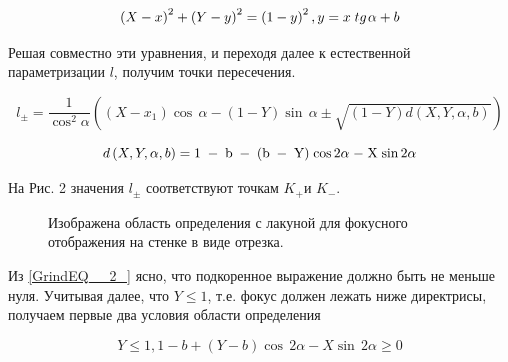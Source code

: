 \documentclass[a4paper]{article}
\begin{document}
\begin{equation} \label{GrindEQ__1_} \left(X-x\right)^{2} +\left(Y-y\right)^{2} =\left(1-y\right)^{2}  , y=x\; tg{\kern 1pt} \alpha +b \end{equation}

Решая совместно эти уравнения, и переходя далее к естественной параметризации $l$, получим точки пересечения.

\begin{equation} \label{GrindEQ__2_}  l_{\pm } =\frac{1}{\cos ^{2} \alpha } \left(\left(X-x_{1} \right)\cos \, \alpha -\left(1-Y\right)\sin \, \alpha \pm \sqrt{\left(1-Y\right)d\left(X,Y,\alpha ,b\right)} \right)\end{equation}

\[d\left(X,Y,\alpha ,b\right)={\rm 1\; -\; b\; -\; (b\; -\; Y)\; cos}\, {\rm 2}\alpha {\rm \; -\; X\; sin}\, {\rm 2}\alpha \]

На Рис. 2 значения $l_{\pm } $ соответствуют точкам $K_{+} $и $K_{-} $.


\begin{figure}[h]
\caption{Изображена область определения с лакуной для фокусного отображения на стенке в виде отрезка.}
\label{image5}
\end{figure}

Из \eqref{GrindEQ__2_} ясно, что подкоренное выражение должно быть не меньше нуля. Учитывая далее, что $Y\le 1$, т.е. фокус должен лежать ниже директрисы, получаем первые два условия области определения

\begin{equation} \label{GrindEQ__3_} Y\le 1,  1-b+\left(Y-b\right)\cos \, 2\alpha -X\sin \, 2\alpha \ge 0 \end{equation}
\end{document}
